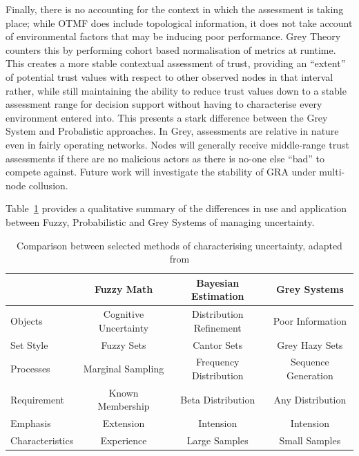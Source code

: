 \documentclass[runningheads,a4paper]{llncs}
\begin{document}
Finally, there is no accounting for the context in which the assessment is taking place; while OTMF does include topological information, it does not take account of environmental factors that may be inducing poor performance.
Grey Theory counters this by performing cohort based normalisation of metrics at runtime. 
This creates a more stable contextual assessment of trust, providing an ``extent'' of potential trust values with respect to other observed nodes in that interval rather, while still maintaining the ability to reduce trust values down to a stable assessment range for decision support without having to characterise every environment entered into.
This presents a stark difference between the Grey System and Probalistic approaches.
In Grey, assessments are relative in nature even in fairly operating networks.
Nodes will generally receive middle-range trust assessments if there are no malicious actors as there is no-one else ``bad'' to compete against.
Future work will investigate the stability of GRA under multi-node collusion.

Table~\ref{tab:uncertainty} provides a qualitative summary of the differences in use and application between Fuzzy, Probabilistic and Grey Systems of managing uncertainty.


\begin{table}[h]
  \caption{Comparison between selected methods of characterising uncertainty, adapted from \cite{Guo11} \cite{Liu2006} \cite{Ng1994} \cite{Wang2006} }
  \label{tab:uncertainty}
  \begin{center}
    \setlength{\tabcolsep}{8pt}
    \begin{tabular}{l|ccc}
      \toprule
        & Fuzzy Math & Bayesian Estimation & Grey Systems \\
      \midrule
      Objects & Cognitive Uncertainty & Distribution Refinement & Poor Information \\
      Set Style & Fuzzy Sets & Cantor Sets & Grey Hazy Sets \\
      Processes & Marginal Sampling & Frequency Distribution & Sequence Generation \\
      Requirement & Known Membership & Beta Distribution & Any Distribution \\
      Emphasis & Extension & Intension & Intension \\
      Characteristics & Experience & Large Samples & Small Samples\\
     \bottomrule
    \end{tabular}
    \setlength{\tabcolsep}{6pt}
  \end{center}
\end{table}
\end{document}
